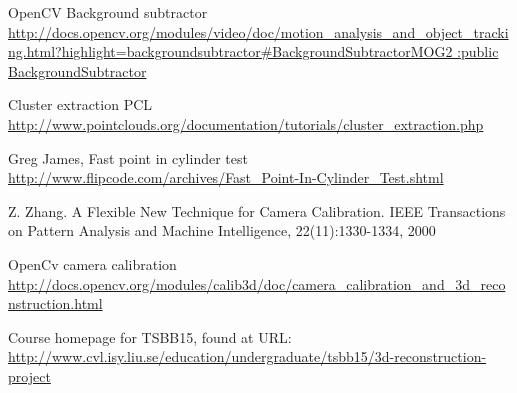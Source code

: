 \documentclass[10pt,a4paper]{article}
\begin{document}



\pagebreak
\tableofcontents
\newpage












	



\begin{thebibliography}{9}



OpenCV Background subtractor\\
\url{http://docs.opencv.org/modules/video/doc/motion_analysis_and_object_tracking.html?highlight=backgroundsubtractor#BackgroundSubtractorMOG2 :public BackgroundSubtractor}

Cluster extraction PCL\\
\url{http://www.pointclouds.org/documentation/tutorials/cluster_extraction.php}

Greg James, Fast point in cylinder test\\
\url{http://www.flipcode.com/archives/Fast_Point-In-Cylinder_Test.shtml}

Z. Zhang. A Flexible New Technique for Camera Calibration. IEEE Transactions on Pattern Analysis and Machine Intelligence, 22(11):1330-1334, 2000

OpenCv camera calibration\\
\url{http://docs.opencv.org/modules/calib3d/doc/camera_calibration_and_3d_reconstruction.html}

Course homepage for TSBB15, found at URL:
\url{http://www.cvl.isy.liu.se/education/undergraduate/tsbb15/3d-reconstruction-project}

\end{thebibliography}

\end{document}
